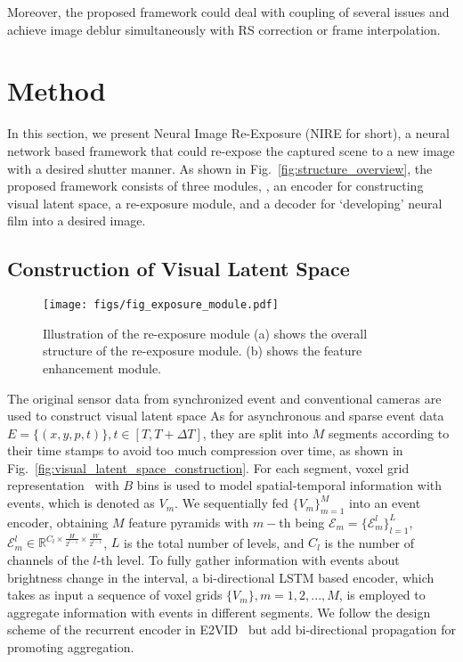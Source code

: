 \documentclass[10pt,twocolumn,letterpaper]{article}
\begin{document}
Moreover, the proposed framework could deal with coupling of several issues and achieve image deblur simultaneously with RS correction or frame interpolation.



 
\section{Method}

In this section, we present Neural Image Re-Exposure (NIRE for short), 
a neural network based framework that could re-expose the captured scene to a new image with a desired shutter manner.
As shown in Fig.~\ref{fig:structure_overview}, the proposed framework consists of three modules, \ie, an encoder for constructing visual latent space, a re-exposure module, and a decoder for `developing' neural film into a desired image.

\subsection{Construction of Visual Latent Space}
\label{sec:Construction of Visual Latent Space}

\begin{figure*}[h!]
\centering
\texttt{[image: figs/fig\_exposure\_module.pdf]}
\caption{Illustration of the re-exposure module
(a) shows the overall structure of the re-exposure module.
(b) shows the feature enhancement module.
}
\label{fig:exposing_simulation}
\vspace{-1.0em}
\end{figure*}

The original sensor data from synchronized event and conventional cameras are used to construct visual latent space
As for asynchronous and sparse event data $E = \{(x,y,p,t)\}, t \in [T,T+\Delta T]$, they are split into $M$ segments according to their time stamps to avoid too much compression over time, as shown in Fig.~\ref{fig:visual_latent_space_construction}. For each segment, voxel grid representation~\cite{voxel_grid} with $B$ bins is used to model spatial-temporal information with events, which is denoted as ${V_m}$.
We sequentially fed $\{V_m\}^{M}_{m=1}$ into an event encoder, obtaining $M$ feature pyramids with $m-$th being
$\mathcal{E}_m=\{ \mathcal{E}^l_m \}_{l=1}^{L}$, $\mathcal{E}^l_m \in \mathbb{R}^{C_l\times\frac{H}{2^{l-1}}\times\frac{W}{2^{l-1}}}$, $L$ is the total number of levels, and $C_l$ is the number of channels of the $l$-th level.
To fully gather information with events about brightness change in the interval, a bi-directional LSTM based encoder, which takes as input a sequence of voxel grids $\{V_m\}, m = 1, 2, ...,M$, is employed to aggregate information with events in different segments.
We follow the design scheme of the recurrent encoder in E2VID~\cite{E2VID} but add bi-directional propagation for promoting aggregation.
\end{document}
